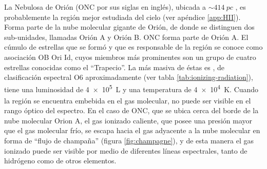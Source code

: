 La Nebulosa de Orión (ONC por sus siglas en inglés), ubicada a $\sim \SI{414}{pc}$ \citep{Menten:2007}, es probablemente la región  mejor estudiada del cielo (ver apéndice \ref{app:HII}). Forma parte de la nube molecular gigante de Orión, de donde se distinguen dos sub-unidades, llamadas Orión A y Orión B. ONC forma parte de Orión A. El cúmulo de estrellas que se formó y que es responsable de la región  se conoce como asociación OB Ori Id, cuyos miembros más prominentes son un grupo de cuatro estrellas conocidas como el ``Trapecio''. La más masiva de éstas es \thC{}, de clasificación espectral O6 aproximadamente (ver tabla \ref{tab:ionizing-radiation}), tiene una luminosidad de \SI{4e5}{L_\odot} y una temperatura de \SI{4e4}{K}. Cuando la región  se encuentra embebida en el gas molecular, no puede ser visible en el rango óptico del espectro. En el caso de ONC, que se ubica cerca del borde de la nube molecular Orion A, el gas ionizado caliente, que posee una presión mayor que el gas molecular frío, se escapa hacia el gas adyacente a la nube molecular en forma de ``flujo de champaña'' (figura \ref{fig:champagne}), y de esta manera el gas ionizado puede ser visible por medio de diferentes líneas espectrales, tanto de hidrógeno como de otros elementos. 

